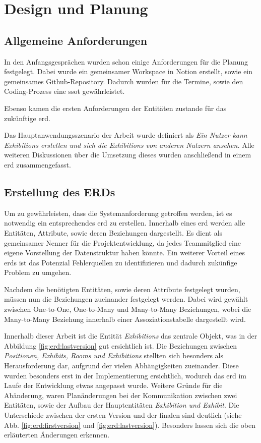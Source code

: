 \section{Design und Planung}

\subsection{Allgemeine Anforderungen}
In den Anfangsgesprächen wurden schon einige Anforderungen für die Planung festgelegt. 
Dabei wurde ein gemeinsamer Workspace in Notion erstellt, sowie ein gemeinsames Github-Repository.
Dadurch wurden für die Termine, sowie den Coding-Prozess eine \gls{ssot} gewährleistet.

Ebenso kamen die ersten Anforderungen der Entitäten zustande für das zukünftige \gls{erd}.

Das Hauptanwendungsszenario der Arbeit wurde definiert als \emph{Ein Nutzer kann Exhibitions erstellen und sich die Exhibitions von anderen Nutzern ansehen.} 
Alle weiteren Diskussionen über die Umsetzung dieses wurden anschließend in einem \gls{erd} zusammengefasst.

\subsection{Erstellung des ERDs}
Um zu gewährleisten, dass die Systemanforderung getroffen werden, ist es notwendig ein entsprechendes \gls{erd} zu erstellen.
Innerhalb eines \gls{erd} werden alle Entitäten, Attribute, sowie deren Beziehungen dargestellt.
Es dient als gemeinsamer Nenner für die Projektentwicklung, da jedes Teammitglied eine eigene Vorstellung der Datenstruktur haben könnte. 
Ein weiterer Vorteil eines \gls{erd}s ist das Potenzial Fehlerquellen zu identifizieren und dadurch zukünfige Problem zu umgehen. 

Nachdem die benötigten Entitäten, sowie deren Attribute festgelegt wurden, müssen nun die Beziehungen zueinander festgelegt werden. 
Dabei wird gewählt zwischen One-to-One, One-to-Many und Many-to-Many Beziehungen, wobei die Many-to-Many Beziehung innerhalb einer Assoziationstabelle dargestellt wird. 

Innerhalb dieser Arbeit ist die Entität \emph{Exhibitions} das zentrale Objekt, was in der Abbildung \ref{fig:erd:lastversion} gut ersichtlich ist.
Die Beziehungen zwischen \emph{Positionen, Exhibits, Rooms und Exhibitions} stellten sich besonders als Herausforderung dar, aufgrund der vielen Abhängigkeiten zueinander. 
Diese wurden besonders erst in der Implementierung ersichtlich, wodurch das \gls{erd} im Laufe der Entwicklung etwas angepasst wurde. 
Weitere Gründe für die Abänderung, waren Planänderungen bei der Kommunikation zwischen zwei Entitäten, sowie der Aufbau der Hauptentitäten \emph{Exhibition und Exhibit}. 
Die Unterschiede zwischen der ersten Version und der finalen sind deutlich (siehe Abb. \ref{fig:erd:firstversion} und \ref{fig:erd:lastversion}).
Besonders lassen sich die oben erläuterten Änderungen erkennen. 
 
